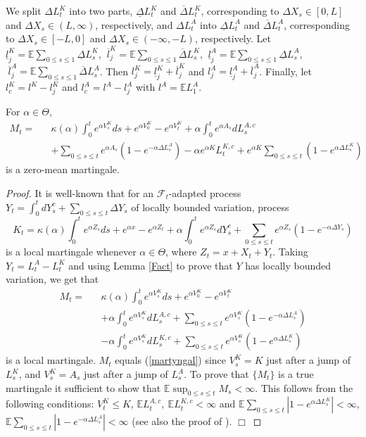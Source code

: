\documentclass{aptpub}
\begin{document}
We split $\Delta L_t^K$ into two parts, $\underline{\Delta}L_t^K$ and $\overline{\Delta}L_t^K$, corresponding to $\Delta X_s\in[0,L]$ and $\Delta X_s\in(L,\infty)$, respectively, and $\Delta L_t^A$ into  $\underline{\Delta}L_t^A$ and $\overline{\Delta}L_t^A$, corresponding to $\Delta X_s\in[-L,0]$ and $\Delta X_s\in(-\infty,-L)$, respectively. Let $\underline{l}_j^K=\mathbb{E}\sum_{0\leq s\leq 1}\underline{\Delta}L_s^K$, $\ \overline{l}_j^K=\mathbb{E}\sum_{0\leq s\leq 1}\overline{\Delta}L_s^K$, $\ \underline{l}_j^A=\mathbb{E}\sum_{0\leq s\leq 1}\underline{\Delta}L_s^A$, $\ \overline{l}_j^A=\mathbb{E}\sum_{0\leq s\leq 1}\overline{\Delta}L_s^A$. Then $l_j^K=\underline{l}_j^K+\overline{l}_j^K$ and $l_j^A=\underline{l}_j^A+\overline{l}_j^A$. Finally, let
$l_c^K=l^K-l^K_j$ and $l_c^A=l^A-l^A_j$ with $l^A=\mathbb{E}L^A_1$.
\begin{thm}
For $\alpha\in\Theta$,
\begin{eqnarray}\nonumber M_t =&& \kappa(\alpha)\int_0^te^{\alpha V_s^K}ds+e^{\alpha V_0^K}-e^{\alpha V_t^K}+\alpha\int_0^te^{\alpha A_s}dL_s^{A,c}\\&& +\sum_{0\leq s\leq t}e^{\alpha A_s}(1-e^{-\alpha\Delta L_s^A})-\alpha e^{\alpha K}L_t^{K,c} + e^{\alpha K}\sum_{0\leq s\leq t}(1-e^{\alpha\Delta L_s^K})\label{martyngal}\end{eqnarray}
is a zero-mean martingale.
\end{thm}
\begin{proof}
It is well-known that for an $\mathcal{F}_t$-adapted process
$Y_t=\int_0^tdY_s^c+\sum_{0\leq s\leq t}\Delta Y_s$
of locally bounded variation, process
$$K_t=\kappa(\alpha)\int_0^te^{\alpha Z_s}ds+e^{\alpha x}-e^{\alpha Z_t}+\alpha \int_0^te^{\alpha Z_s}dY_s^c+\sum_{0\leq s\leq t}e^{\alpha Z_s}(1-e^{-\alpha\Delta Y_s})$$
is a local martingale whenever $\alpha\in\Theta$, where $Z_t=x+X_t+Y_t$.
Taking $Y_t=L_t^A-L_t^K$ and using Lemma \ref{Fact} to prove that $Y$ has locally bounded variation, we get that
\begin{eqnarray}\nonumber M_t=&&\kappa(\alpha)\int_0^te^{\alpha V_s^K}ds+e^{\alpha V_0^K}-e^{\alpha V_t^K}\\ \nonumber &&+ \alpha\int_0^te^{\alpha V_s^K}dL_s^{A,c}+\sum_{0\leq s\leq t}e^{\alpha V_s^K}(1-e^{-\alpha\Delta L_s^A})\\
\nonumber &&- \alpha \int_0^te^{\alpha V_s^K}dL_s^{K,c}+\sum_{0\leq s\leq t}e^{\alpha V_s^K}(1-e^{\alpha\Delta L_s^K})\end{eqnarray}
is a local martingale. $M_t$ equals (\ref{martyngal}) since $V_s^K=K$ just after a jump of $L_s^K$, and $V_s^K=A_s$ just after a jump of $L_s^A$.
To prove that $\{M_t\}$ is a true martingale it sufficient to show that $\mathbb{E}\sup_{0\leq s\leq t}M_s<\infty$. This follows from the following conditions:
$V_t^K\leq K$, $\mathbb{E}L_t^{A,c},\ \mathbb{E}L_t^{K,c}<\infty$ and $\mathbb{E}\sum_{0\leq s\leq t}|1-e^{\alpha\Delta L_s^{K}}|<\infty$,
$\mathbb{E}\sum_{0\leq s\leq t}|1-e^{-\alpha\Delta L_s^{A}}|<\infty$ (see also the proof of \cite[Prop. 3.1]{AP}).
{\newline\vspace{3mm}\hfill $\Box$}\end{proof}
\end{document}
